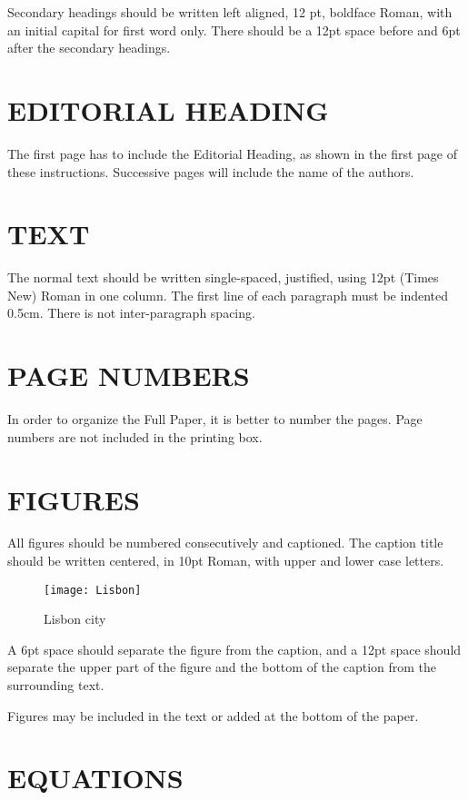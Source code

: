 \documentclass[a4paper]{eccomas_paper-2024}
\begin{document}
Secondary headings should be written left aligned, 12 pt, boldface
Roman, with an initial capital for first word only. There should
be a 12pt space before and 6pt after the secondary headings.

\section{EDITORIAL HEADING}

The first page has to include the Editorial Heading, as shown in
the first page of these instructions. Successive pages will
include the name of the authors.

\section{TEXT}

The normal text should be written single-spaced, justified, using
12pt (Times New) Roman in one column. The first line of each
paragraph must be indented 0.5cm. There is not inter-paragraph
spacing.

\section{PAGE NUMBERS}

In order to organize the Full Paper, it is better to number
the pages. Page numbers are not included in the printing box.

\section{FIGURES}

All figures should be numbered consecutively and captioned. The
caption title should be written centered, in 10pt Roman, with
upper and lower case letters.

\begin{figure}[t]
\centering
\texttt{[image: Lisbon]}
\caption{Lisbon city}
\end{figure}

A 6pt space should separate the figure from the caption, and a
12pt space should separate the upper part of the figure and the
bottom of the caption from the surrounding text.

Figures may be included in the text or added at the bottom of the paper.

\section{EQUATIONS}
\end{document}
